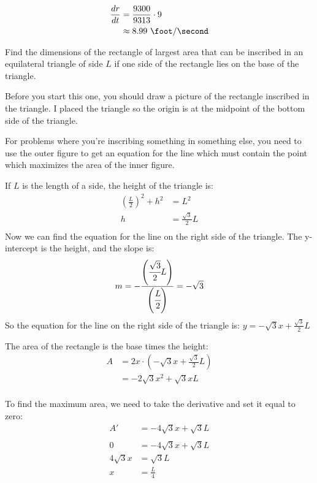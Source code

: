 \documentclass[fleqn,addpoints]{exam}
\begin{document}
\begin{questions}
\begin{solution}
\begin{align*}
  \frac{dr}{dt} &= \frac{9300}{9313} \cdot 9 \\
  &\approx 8.99 \ \foot/\second \\
\end{align*}

\end{solution}

\question Find the dimensions of the rectangle of largest area that can be inscribed in an equilateral triangle of side
$L$ if one side of the rectangle lies on the base of the triangle.

\begin{solution}
Before you start this one, you should draw a picture of the rectangle inscribed in the triangle.  I placed the triangle
so the origin is at the midpoint of the bottom side of the triangle.
 
For problems where you're inscribing something in something else, you need to use the outer figure to get an equation
for the line which must contain the point which maximizes the area of the inner figure.

If $L$ is the length of a side, the height of the triangle is:
\begin{align*}
  \left( \frac{L}{2} \right)^2 + h^2 &= L^2 \\
  h &= \frac{\sqrt{3}}{2} L \\
\end{align*}
Now we can find the equation for the line on the right side of the triangle.  The y-intercept is the height, and the
slope is:
\[
  m = - \frac{\left( \cfrac{\sqrt{3}}{2} L \right)}{\left( \cfrac{L}{2} \right) } = - \sqrt{3} 
\]
So the equation for the line on the right side of the triangle is: $y = - \sqrt{3} x + \frac{\sqrt{3}}{2} L$

The area of the rectangle is the base times the height:
\begin{align*}
  A &= 2x \cdot \left( - \sqrt{3} x + \frac{\sqrt{3}}{2} L \right) \\
    &= - 2 \sqrt{3} x^2 + \sqrt{3} xL \\
\end{align*}

To find the maximum area, we need to take the derivative and set it equal to zero:
\begin{align*}
  A' &= -4 \sqrt{3} x + \sqrt{3} L \\
\\
  0 &= -4 \sqrt{3} x + \sqrt{3} L \\
  4 \sqrt{3} x &= \sqrt{3} L \\
  x &= \frac{L}{4} \\ 
\end{align*}


\end{solution}
\end{questions}
\end{document}
